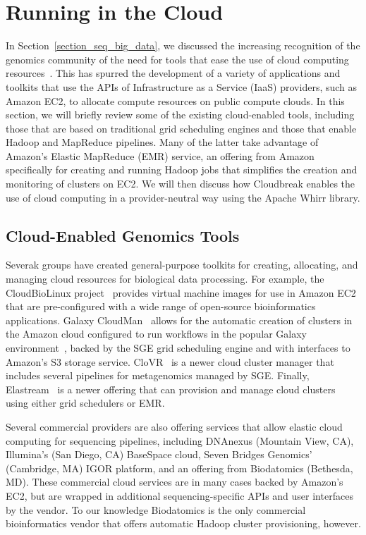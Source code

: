 \section{Running in the Cloud}\label{section_cloud_whirr}

In Section~\ref{section_seq_big_data}, we discussed the increasing recognition of the genomics community of the need for tools that ease the use of cloud computing resources~\cite{Schatz:2010js,Stein:2010gp}. This has spurred the development of a variety of applications and toolkits that use the APIs of Infrastructure as a Service (IaaS) providers, such as Amazon EC2, to allocate compute resources on public compute clouds. In this section, we will briefly review some of the existing cloud-enabled tools, including those that are based on traditional grid scheduling engines and those that enable Hadoop and MapReduce pipelines. Many of the latter take advantage of Amazon's Elastic MapReduce (EMR) service, an offering from Amazon specifically for creating and running Hadoop jobs that simplifies the creation and monitoring of clusters on EC2. We will then discuss how Cloudbreak enables the use of cloud computing in a provider-neutral way using the Apache Whirr library.

\subsection{Cloud-Enabled Genomics Tools}

Severak groups have created general-purpose toolkits for creating, allocating, and managing cloud resources for biological data processing. For example, the CloudBioLinux project~\cite{Krampis:2012wo} provides virtual machine images for use in Amazon EC2 that are pre-configured with a wide range of open-source bioinformatics applications. Galaxy CloudMan~\cite{Afgan:2010fa} allows for the automatic creation of clusters in the Amazon cloud configured to run workflows in the popular Galaxy environment~\cite{Giardine:2005ig}, backed by the SGE grid scheduling engine and with interfaces to Amazon's S3 storage service. CloVR~\cite{Angiuoli:2011wl} is a newer cloud cluster manager that includes several pipelines for metagenomics managed by SGE. Finally, Elastream~\cite{Issa:2013jp} is a newer offering that can provision and manage cloud clusters using either grid schedulers or EMR. 

Several commercial providers are also offering services that allow elastic cloud computing for sequencing pipelines, including DNAnexus (Mountain View, CA), Illumina's (San Diego, CA) BaseSpace cloud, Seven Bridges Genomics' (Cambridge, MA) IGOR platform, and an offering from Biodatomics (Bethesda, MD). These commercial cloud services are in many cases backed by Amazon's EC2, but are wrapped in additional sequencing-specific APIs and user interfaces by the vendor. To our knowledge Biodatomics is the only commercial bioinformatics vendor that offers automatic Hadoop cluster provisioning, however. 

